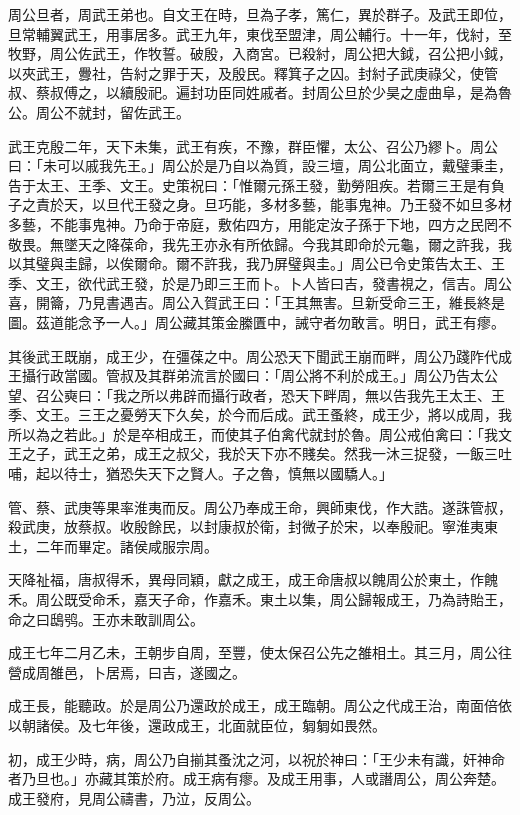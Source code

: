 
\begin{pinyinscope}
周公旦者，周武王弟也。自文王在時，旦為子孝，篤仁，異於群子。及武王即位，旦常輔翼武王，用事居多。武王九年，東伐至盟津，周公輔行。十一年，伐紂，至牧野，周公佐武王，作牧誓。破殷，入商宮。已殺紂，周公把大鉞，召公把小鉞，以夾武王，釁社，告紂之罪于天，及殷民。釋箕子之囚。封紂子武庚祿父，使管叔、蔡叔傅之，以續殷祀。遍封功臣同姓戚者。封周公旦於少昊之虛曲阜，是為魯公。周公不就封，留佐武王。

武王克殷二年，天下未集，武王有疾，不豫，群臣懼，太公、召公乃繆卜。周公曰：「未可以戚我先王。」周公於是乃自以為質，設三壇，周公北面立，戴璧秉圭，告于太王、王季、文王。史策祝曰：「惟爾元孫王發，勤勞阻疾。若爾三王是有負子之責於天，以旦代王發之身。旦巧能，多材多藝，能事鬼神。乃王發不如旦多材多藝，不能事鬼神。乃命于帝庭，敷佑四方，用能定汝子孫于下地，四方之民罔不敬畏。無墜天之降葆命，我先王亦永有所依歸。今我其即命於元龜，爾之許我，我以其璧與圭歸，以俟爾命。爾不許我，我乃屏璧與圭。」周公已令史策告太王、王季、文王，欲代武王發，於是乃即三王而卜。卜人皆曰吉，發書視之，信吉。周公喜，開籥，乃見書遇吉。周公入賀武王曰：「王其無害。旦新受命三王，維長終是圖。茲道能念予一人。」周公藏其策金縢匱中，誡守者勿敢言。明日，武王有瘳。

其後武王既崩，成王少，在彊葆之中。周公恐天下聞武王崩而畔，周公乃踐阼代成王攝行政當國。管叔及其群弟流言於國曰：「周公將不利於成王。」周公乃告太公望、召公奭曰：「我之所以弗辟而攝行政者，恐天下畔周，無以告我先王太王、王季、文王。三王之憂勞天下久矣，於今而后成。武王蚤終，成王少，將以成周，我所以為之若此。」於是卒相成王，而使其子伯禽代就封於魯。周公戒伯禽曰：「我文王之子，武王之弟，成王之叔父，我於天下亦不賤矣。然我一沐三捉發，一飯三吐哺，起以待士，猶恐失天下之賢人。子之魯，慎無以國驕人。」

管、蔡、武庚等果率淮夷而反。周公乃奉成王命，興師東伐，作大誥。遂誅管叔，殺武庚，放蔡叔。收殷餘民，以封康叔於衛，封微子於宋，以奉殷祀。寧淮夷東土，二年而畢定。諸侯咸服宗周。

天降祉福，唐叔得禾，異母同穎，獻之成王，成王命唐叔以餽周公於東土，作餽禾。周公既受命禾，嘉天子命，作嘉禾。東土以集，周公歸報成王，乃為詩貽王，命之曰鴟鸮。王亦未敢訓周公。

成王七年二月乙未，王朝步自周，至豐，使太保召公先之雒相土。其三月，周公往營成周雒邑，卜居焉，曰吉，遂國之。

成王長，能聽政。於是周公乃還政於成王，成王臨朝。周公之代成王治，南面倍依以朝諸侯。及七年後，還政成王，北面就臣位，匔匔如畏然。

初，成王少時，病，周公乃自揃其蚤沈之河，以祝於神曰：「王少未有識，奸神命者乃旦也。」亦藏其策於府。成王病有瘳。及成王用事，人或譖周公，周公奔楚。成王發府，見周公禱書，乃泣，反周公。


\end{pinyinscope}
